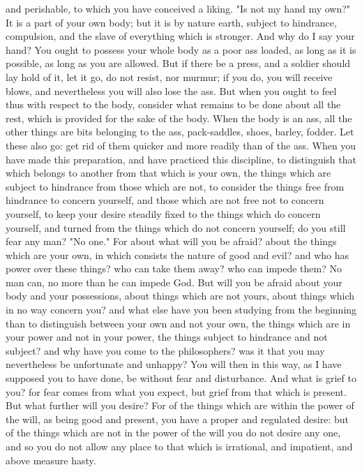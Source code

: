 \documentclass[a4paper]{article}
\begin{document}
and perishable, to which you have conceived a liking. "Is not my hand my own?"
It is a part of your own body; but it is by nature earth, subject to hindrance,
compulsion, and the slave of everything which is stronger. And why do I say
your hand? You ought to possess your whole body as a poor ass loaded, as long
as it is possible, as long as you are allowed. But if there be a press, and a
soldier should lay hold of it, let it go, do not resist, nor murmur; if you do,
you will receive blows, and nevertheless you will also lose the ass. But when
you ought to feel thus with respect to the body, consider what remains to be
done about all the rest, which is provided for the sake of the body. When the
body is an ass, all the other things are bits belonging to the ass,
pack-saddles, shoes, barley, fodder. Let these also go: get rid of them quicker
and more readily than of the ass.
    When you have made this preparation, and have practiced this discipline, to
distinguish that which belongs to another from that which is your own, the
things which are subject to hindrance from those which are not, to consider the
things free from hindrance to concern yourself, and those which are not free
not to concern yourself, to keep your desire steadily fixed to the things which
do concern yourself, and turned from the things which do not concern yourself;
do you still fear any man? "No one." For about what will you be afraid? about
the things which are your own, in which consists the nature of good and evil?
and who has power over these things? who can take them away? who can impede
them? No man can, no more than he can impede God. But will you be afraid about
your body and your possessions, about things which are not yours, about things
which in no way concern you? and what else have you been studying from the
beginning than to distinguish between your own and not your own, the things
which are in your power and not in your power, the things subject to hindrance
and not subject? and why have you come to the philosophers? was it that you may
nevertheless be unfortunate and unhappy? You will then in this way, as I have
supposed you to have done, be without fear and disturbance. And what is grief
to you? for fear comes from what you expect, but grief from that which is
present. But what further will you desire? For of the things which are within
the power of the will, as being good and present, you have a proper and
regulated desire: but of the things which are not in the power of the will you
do not desire any one, and so you do not allow any place to that which is
irrational, and impatient, and above measure hasty.
\end{document}
